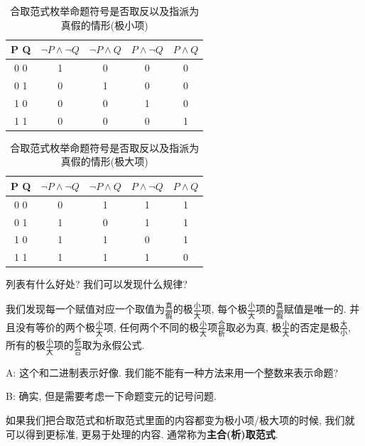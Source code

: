 \begin{table}
	\centering
	\begin{tabular}{|c|c|c|c|c|}
		\hline
		P Q & $\lnot P \land \lnot Q$ & $\lnot P \land  Q$ & $P \land \lnot Q $& $ P \land  Q$\\
		\hline
		0 0 & 1 & 0 & 0 & 0\\
		0 1 & 0 & 1 & 0 & 0\\
		1 0 & 0 & 0 & 1 & 0\\
		1 1 & 0 & 0 & 0 & 1\\
		\hline
	\end{tabular}
	\label{tab:min}
	\caption{合取范式枚举命题符号是否取反以及指派为真假的情形(极小项)}
\end{table}

\begin{table}
	\centering
	\begin{tabular}{|c|c|c|c|c|}
		\hline
		P Q & $\lnot P \land \lnot Q$ & $\lnot P \land  Q$ & $P \land \lnot Q $& $ P \land  Q$\\
		\hline
		0 0 & 0 & 1 & 1 & 1\\
		0 1 & 1 & 0 & 1 & 1\\
		1 0 & 1 & 1 & 0 & 1\\
		1 1 & 1 & 1 & 1 & 0\\
		\hline
	\end{tabular}
	\label{tab:max}
	\caption{合取范式枚举命题符号是否取反以及指派为真假的情形(极大项)}
\end{table}

\begin{bonus}
	列表有什么好处? 我们可以发现什么规律? 
\end{bonus}

我们发现每一个赋值对应一个取值为$\frac{\text{真}}{\text{假}}$的极$\frac{\text{小}}{\text{大}}$项, 每个极$\frac{\text{小}}{\text{大}}$项的$\frac{\text{真}}{\text{假}}$赋值是唯一的. 并且没有等价的两个极$\frac{\text{小}}{\text{大}}$项, 任何两个不同的极$\frac{\text{小}}{\text{大}}$项$\frac{\text{合}}{\text{析}}$取必为真, 极$\frac{\text{小}}{\text{大}}$的否定是极$\frac{\text{大}}{\text{小}}$, 所有的极$\frac{\text{小}}{\text{大}}$项的$\frac{\text{析}}{\text{合}}$取为永假公式. 

\begin{dialogue}
	A: 这个和二进制表示好像. 我们能不能有一种方法来用一个整数来表示命题? 
	
	B: 确实, 但是需要考虑一下命题变元的记号问题. 
\end{dialogue}

如果我们把合取范式和析取范式里面的内容都变为极小项/极大项的时候, 我们就可以得到更标准, 更易于处理的内容. 通常称为\textbf{主合(析)取范式}. 

